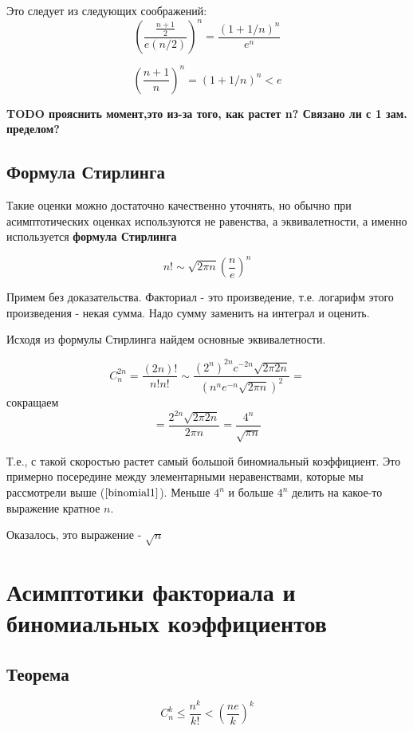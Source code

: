 Это следует из следующих соображений:
$$
\left( \frac{\frac{n+1}{2}} {e (n/2)} \right)^n = \frac{(1 + 1/n)^n}{e^n}
$$

$$ \left( \frac{n+1}{n} \right)^n = (1 + 1/n)^n < e$$

\textbf{TODO прояснить момент,это из-за того, как растет n? Связано ли с 1 зам. пределом?}

\subsection{Формула Стирлинга}

Такие оценки можно достаточно качественно уточнять, но
обычно при асимптотических оценках используются не равенства, а эквивалетности, а именно используется
\textbf{формула Стирлинга}

\begin{equation}
\label{stirling}
n! \sim \sqrt{2 \pi n} \left(\frac{n}{e}\right)^n
\end{equation}

Примем без доказательства.
Факториал - это произведение, т.е. логарифм этого произведения - некая сумма. Надо сумму заменить на интеграл и оценить.

Исходя из формулы Стирлинга найдем основные эквивалетности.

$$
C_{n}^{2n} = \frac{(2n)!}{n!n!} \sim \frac{(2^n)^{2n}c^{-2n} \sqrt{2 \pi 2 n}}{ (n^n e^{-n} \sqrt{2 \pi n})^2 } =
$$
сокращаем
$$
 = \frac{ 2^{2n} \sqrt{2 \pi 2 n}}{2 \pi n} =  \frac{4^n}{\sqrt{\pi n}} 
$$

Т.е., с такой скоростью растет самый большой биномиальный коэффициент. 
Это примерно посередине между элементарными неравенствами, которые мы рассмотрели выше ($ \ref{binomial1} $).
Меньше $ 4^n $ и больше $ 4^n $ делить на какое-то выражение кратное $ n $.

Оказалось, это выражение - $ \sqrt{n} $

\section{Асимптотики факториала и биномиальных коэффициентов}

\subsection{Теорема}

\begin{equation}
\label{factor2}
C_{n}^{k} \le \frac{n^k}{k!} < \left( \frac{ne}{k} \right)^k
\end{equation}

